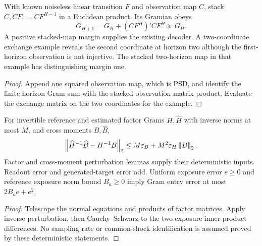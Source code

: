 \begin{theorem}\label{thm:dynamic-observability}
  \leanok
  With known noiseless linear transition $F$ and observation map $C$, stack
  $C,CF,\ldots,CF^{H-1}$ in a Euclidean product. Its Gramian obeys
  \[
    G_{H+1}=G_H+(CF^H)'CF^H\succeq G_H.
  \]
  A positive stacked-map margin supplies the existing decoder. A
  two-coordinate exchange example reveals the second coordinate at horizon
  two although the first-horizon observation is not injective.
  The stacked two-horizon map in that example has distinguishing margin one.
\end{theorem}
\begin{proof}\leanok
  Append one squared observation map, which is PSD, and identify the
  finite-horizon Gram sum with the stacked observation matrix product.
  Evaluate the exchange matrix on the two coordinates for the example.
\end{proof}

\begin{theorem}\label{thm:generated-target}
  \leanok
  For invertible reference and estimated factor Grams $H,\widehat H$ with
  inverse norms at most $M$, and cross moments $B,\widehat B$,
  \[
    \left\lVert\widehat H^{-1}\widehat B-H^{-1}B\right\rVert_2
    \le M\varepsilon_B+M^2\varepsilon_H\left\lVert B\right\rVert_2.
  \]
  Factor and cross-moment perturbation lemmas supply their deterministic
  inputs. Readout error and generated-target error add. Uniform exposure
  error $e\ge0$ and reference exposure norm bound $B_a\ge0$ imply Gram
  entry error at most $2B_ae+e^2$.
\end{theorem}
\begin{proof}\leanok
  Telescope the normal equations and products of factor matrices. Apply
  inverse perturbation, then Cauchy--Schwarz to the two exposure inner-product
  differences. No sampling rate or common-shock identification is assumed
  proved by these deterministic statements.
\end{proof}

